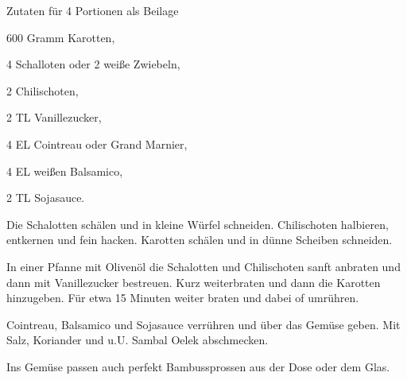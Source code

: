 \startsection[title={Scharf/fruchtiges Karottengemüse},
              reference=scharf-fruchtiges-karottengemuese]

\startitemize
\item Zutaten für 4 Portionen als Beilage
      \startitemize
      \item 600 Gramm Karotten,
      \item 4 Schalloten oder 2 weiße Zwiebeln,
      \item 2 Chilischoten,
      \item 2 TL Vanillezucker,
      \item 4 EL Cointreau oder Grand Marnier,
      \item 4 EL weißen Balsamico,
      \item 2 TL Sojasauce.
      \stopitemize

\item Die Schalotten schälen und in kleine Würfel schneiden.
  Chilischoten halbieren, entkernen und fein hacken. Karotten schälen
  und in dünne Scheiben schneiden.
\item In einer Pfanne mit Olivenöl die Schalotten und Chilischoten
  sanft anbraten und dann mit Vanillezucker bestreuen. Kurz weiterbraten
  und dann die Karotten hinzugeben. Für etwa 15 Minuten weiter braten
  und dabei of umrühren.
\item Cointreau, Balsamico und Sojasauce verrühren und über das Gemüse
  geben. Mit Salz, Koriander und u.U. Sambal Oelek abschmecken.
\item Ins Gemüse passen auch perfekt Bambussprossen aus der Dose oder
  dem Glas.
\stopitemize

\stopsection
